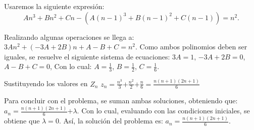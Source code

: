 \documentclass{article}
\begin{document}
Usaremos la siguiente expresión:
\begin{equation}
  \label{polinomial}
   An^3+Bn^2+Cn-(A(n-1)^3+B(n-1)^2+C(n-1))=n^2.  
\end{equation}

Realizando algunas operaciones se llega a:
$3An^2+(-3A+2B)n+A-B+C=n^2$.
Como ambos polinomios deben ser iguales, se resuelve el siguiente sistema de ecuaciones:
$3A=1$,
$-3A+2B=0$,
$A-B+C=0$,
Con lo cual: $A=\frac{1}{3}$, $B=\frac{1}{2}$, $C=\frac{1}{6}$.

Sustituyendo los valores en $Z_n$
$z_n=\frac{n^3}{3}$$+\frac{n^2}{2}$$+\frac{n}{6}=$$\frac{n(n+1)(2n+1)}{6}$

Para concluir con el problema, se suman ambas soluciones, obteniendo que:
$a_n=\frac{n(n+1)(2n+1)}{6}$$+\lambda$.
Con lo cual, evaluando con las condiciones iniciales, se obtiene que $\lambda$$=0$.
Así, la solución del problema es:
$a_n=\frac{n(n+1)(2n+1)}{6}$.
\end{document}

